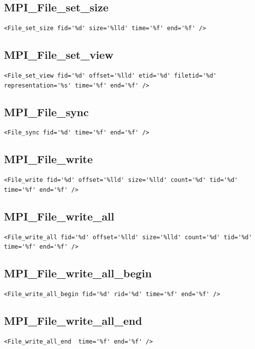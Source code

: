 \documentclass[a4paper,12pt,pdftex]{scrartcl}
\begin{document}
\subsection{MPI\_File\_set\_size}
\begin{lstlisting}
<File_set_size fid='%d' size='%lld' time='%f' end='%f' />
\end{lstlisting}

\subsection{MPI\_File\_set\_view}
\begin{lstlisting}
<File_set_view fid='%d' offset='%lld' etid='%d' filetid='%d' representation='%s' time='%f' end='%f' />
\end{lstlisting}

\subsection{MPI\_File\_sync}
\begin{lstlisting}
<File_sync fid='%d' time='%f' end='%f' />
\end{lstlisting}

\subsection{MPI\_File\_write}
\begin{lstlisting}
<File_write fid='%d' offset='%lld' size='%lld' count='%d' tid='%d' time='%f' end='%f' />
\end{lstlisting}

\subsection{MPI\_File\_write\_all}
\begin{lstlisting}
<File_write_all fid='%d' offset='%lld' size='%lld' count='%d' tid='%d' time='%f' end='%f' />
\end{lstlisting}

\subsection{MPI\_File\_write\_all\_begin}
\begin{lstlisting}
<File_write_all_begin fid='%d' rid='%d' time='%f' end='%f' />
\end{lstlisting}

\subsection{MPI\_File\_write\_all\_end}
\begin{lstlisting}
<File_write_all_end  time='%f' end='%f' />
\end{lstlisting}
\end{document}

